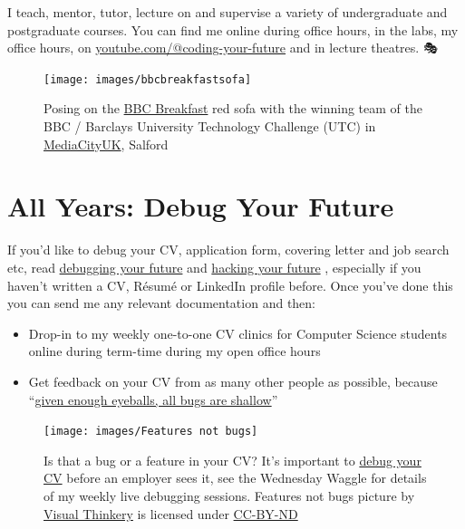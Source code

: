 \documentclass[
  12pt,
]{book}
\providecommand{\tightlist}{%
  \setlength{\itemsep}{0pt}\setlength{\parskip}{0pt}}
\begin{document}
I teach, mentor, tutor, lecture on and supervise a variety of undergraduate and postgraduate courses. You can find me online during office hours, in the labs, my office hours, on \href{https://www.youtube.com/@coding-your-future}{youtube.com/@coding-your-future} and in lecture theatres. 🎭

\begin{figure}

{\centering \texttt{[image: images/bbcbreakfastsofa]} 

}

\caption{Posing on the \href{https://en.wikipedia.org/wiki/BBC_Breakfast}{BBC Breakfast} red sofa with the winning team of the BBC / Barclays University Technology Challenge (UTC) in \href{https://en.wikipedia.org/wiki/MediaCityUK}{MediaCityUK}, Salford}\label{fig:unnamed-chunk-1}
\end{figure}



\hypertarget{allyears}{%
\section{All Years: Debug Your Future}\label{allyears}}

If you'd like to debug your CV, application form, covering letter and job search etc, read \href{https://www.cdyf.me/debugging}{debugging your future} \citep{debugyourfuture} and \href{https://www.cdyf.me/hacking}{hacking your future} \citep{hackingyourfuture}, especially if you haven't written a CV, Résumé or LinkedIn profile before. Once you've done this you can send me any relevant documentation and then:

\begin{itemize}
\tightlist
\item
  Drop-in to my weekly one-to-one CV clinics for Computer Science students online during term-time during my open office hours
\item
  Get feedback on your CV from as many other people as possible, because ``\href{https://en.wikipedia.org/wiki/Linus\%27s_law}{given enough eyeballs, all bugs are shallow}'' \citep{Raymond1999}
\end{itemize}

\begin{figure}

{\centering \texttt{[image: images/Features not bugs]} 

}

\caption{Is that a bug or a feature in your CV? It's important to \href{https://www.cdyf.me/debugging}{debug your CV} before an employer sees it, see the Wednesday Waggle for details of my weekly live debugging sessions. Features not bugs picture by \href{https://visualthinkery.com}{Visual Thinkery} is licensed under \href{https://creativecommons.org/licenses/by-nd/4.0/}{CC-BY-ND}}\label{fig:bugfeature-fig}
\end{figure}
\end{document}
